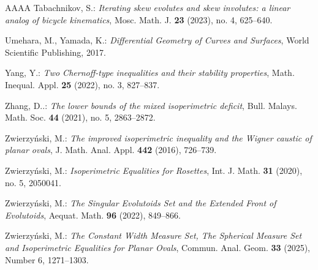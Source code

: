 \documentclass{amsart}
\theoremstyle{definition}
\numberwithin{equation}{section}
\begin{document}
\begin{thebibliography}{AAAA}
 Tabachnikov, S.: \emph{Iterating skew evolutes and skew involutes: a linear analog of bicycle kinematics}, Mosc. Math. J. \textbf{23} (2023), no. 4, 625--640.

 Umehara, M., Yamada, K.: \emph{Differential Geometry of Curves and Surfaces}, World Scientific Publishing, 2017.

 Yang, Y.: \emph{Two Chernoff-type inequalities and their stability properties}, Math. Inequal. Appl. \textbf{25} (2022), no. 3, 827--837.

 Zhang, D..: \emph{The lower bounds of the mixed isoperimetric deficit}, Bull. Malays. Math. Soc. \textbf{44} (2021), no. 5, 2863--2872.

 Zwierzy\'nski, M.: \emph{The improved isoperimetric inequality and the Wigner caustic of planar ovals}, J. Math. Anal. Appl. \textbf{442} (2016), 726--739.


 Zwierzy\'nski, M.: \emph{Isoperimetric Equalities for Rosettes}, Int. J. Math. \textbf{31} (2020), no. 5, 2050041.

 Zwierzy\'nski, M.: \emph{The Singular Evolutoids Set and the Extended Front of Evolutoids}, Aequat. Math. \textbf{96} (2022), 849--866.

 Zwierzy\'nski, M.: \emph{The Constant Width Measure Set, The Spherical Measure Set and Isoperimetric Equalities for Planar Ovals}, Commun. Anal. Geom. \textbf{33} (2025), Number 6, 1271--1303.

\end{thebibliography}
\end{document}
